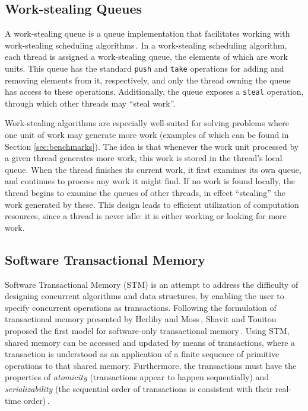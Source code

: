 \subsection{Work-stealing Queues} %
A work-stealing queue is a queue implementation that facilitates working with work-stealing scheduling algorithms\,\citep{Arora:1998:TSM:277651.277678}. In a work-stealing scheduling algorithm, each thread is assigned a work-stealing queue, the elements of which are work units. This queue has the standard \texttt{push} and \texttt{take} operations for adding and removing elements from it, respectively, and only the thread owning the queue has access to these operations. Additionally, the queue exposes a \texttt{steal} operation, through which other threads may ``steal work''.

Work-stealing algorithms are especially well-suited for solving problems where one unit of work may generate more work (examples of which can be found in Section \ref{sec:benchmarks}). The idea is that whenever the work unit processed by a given thread generates more work, this work is stored in the thread's local queue. When the thread finishes its current work, it first examines its own queue, and continues to process any work it might find. If no work is found locally, the thread begins to examine the queues of other threads, in effect ``stealing'' the work generated by these. This design leads to efficient utilization of computation resources, since a thread is never idle: it is either working or looking for more work.

\subsection{Software Transactional Memory}
Software Transactional Memory (STM) is an attempt to address the difficulty of designing concurrent algorithms and data structures, by enabling the user to specify concurrent operations as transactions. Following the formulation of transactional memory presented by Herlihy and Moss\,\citep{HerlihyMossTM}, Shavit and Touitou proposed the first model for software-only transactional memory\,\citep{ShavitSTM}. Using STM, shared memory can be accessed and updated by means of transactions, where a transaction is understood as an application of a finite sequence of primitive operations to that shared memory. Furthermore, the transactions must have the properties of \emph{atomicity} (transactions appear to happen sequentially) and \emph{serializability} (the sequential order of transactions is consistent with their real-time order)\,\cite{ShavitSTM}.

